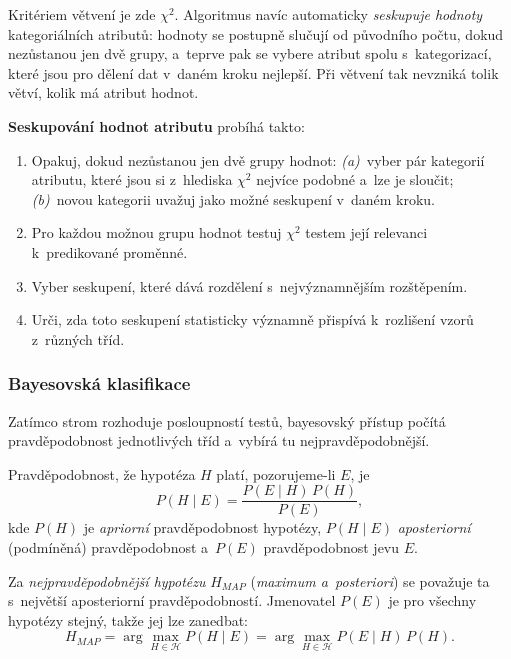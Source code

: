 \documentclass[11pt,a4paper]{article}
\theoremstyle{definition}
\begin{document}
\begin{defbox}
Kritériem větvení je zde $\chi^2$. Algoritmus navíc automaticky \emph{seskupuje hodnoty}
kategoriálních atributů: hodnoty se postupně slučují od původního počtu, dokud nezůstanou jen
dvě grupy, a~teprve pak se vybere atribut spolu s~kategorizací, které jsou pro dělení dat
v~daném kroku nejlepší. Při větvení tak nevzniká tolik větví, kolik má atribut hodnot.

\textbf{Seskupování hodnot atributu} probíhá takto:
\begin{enumerate}
\item Opakuj, dokud nezůstanou jen dvě grupy hodnot:
      \emph{(a)}~vyber pár kategorií atributu, které jsou si z~hlediska $\chi^2$ nejvíce
      podobné a~lze je sloučit; \emph{(b)}~novou kategorii uvažuj jako možné seskupení
      v~daném kroku.
\item Pro každou možnou grupu hodnot testuj $\chi^2$ testem její relevanci k~predikované
      proměnné.
\item Vyber seskupení, které dává  rozdělení s~nejvýznamnějším rozštěpením.
\item Urči, zda toto seskupení statisticky významně přispívá k~rozlišení vzorů z~různých tříd.
\end{enumerate}
\end{defbox}

\subsubsection{Bayesovská klasifikace}

Zatímco strom rozhoduje posloupností testů, bayesovský přístup počítá pravděpodobnost
jednotlivých tříd a~vybírá tu nejpravděpodobnější.

\begin{defbox}
Pravděpodobnost, že hypotéza $H$ platí, pozorujeme-li $E$, je
\[ P(H\mid E)=\frac{P(E\mid H)\,P(H)}{P(E)}, \]
kde $P(H)$ je \emph{apriorní} pravděpodobnost hypotézy, $P(H\mid E)$ \emph{aposteriorní}
(podmíněná) pravděpodobnost a~$P(E)$ pravděpodobnost jevu $E$.

Za \emph{nejpravděpodobnější hypotézu} $H_{MAP}$ (\emph{maximum a~posteriori}) se považuje ta
s~největší aposteriorní pravděpodobností. Jmenovatel $P(E)$ je pro všechny hypotézy stejný,
takže jej lze zanedbat:
\[ H_{MAP}=\arg\max_{H\in\mathcal H} P(H\mid E)=\arg\max_{H\in\mathcal H} P(E\mid H)\,P(H). \]
\end{defbox}
\end{document}
